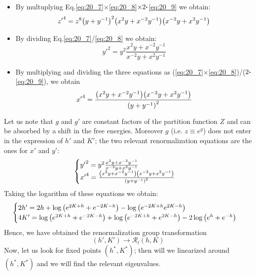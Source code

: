 \documentclass[../main/main.tex]{subfiles}
\begin{document}
\begin{itemize}
\item By multuplying Eq.\eqref{eq:20_7}\( \times \)\eqref{eq:20_8}\( \times 2 \vdot   \)\eqref{eq:20_9} we obtain:
\begin{equation*}
  {z'}^4 = z^8 \qty( y + y^{-1})^2 \qty( x^2y + x^{-2}y^{-1}) \qty( x^{-2}y + x^2 y^{-1})
\end{equation*}
\item By dividing Eq.\eqref{eq:20_7}/\eqref{eq:20_8} we obtain:
\begin{equation*}
  {y'}^2 = y^2 \frac{x^2y + x^{-2}y^{-1}}{x^{-2}y+x^2y^{-1}}
\end{equation*}

\item By multiplying and dividing the three equations as (\eqref{eq:20_7}\( \times \)\eqref{eq:20_8})/(\( 2 \vdot \)\eqref{eq:20_9}), we obtain
\begin{equation*}
  {x'}^4 = \frac{\qty(x^2 y + x^{-2} y^{-1})\qty(x^{-2} y + x^2 y^{-1})  }{ \qty(y + y^{-1})^2 }
\end{equation*}

\end{itemize}

Let us note that \( g \) and \( g' \) are constant factors of the partition function \( Z \) and can be absorbed by a shift in the free energies.
Moreover \( g \) (i.e. \( z \equiv e^g \)) does not enter in the expression of \( h' \) and \( K' \); the two relevant renormalization equations are the ones for \( x' \) and \( y' \):
\begin{equation*}
  \begin{cases}
   {y'}^2 = y^2 \frac{x^2y + x^{-2}y^{-1}}{x^{-2}y+x^2y^{-1}} \\
   {x'}^4 = \frac{\qty(x^2 y + x^{-2} y^{-1})\qty(x^{-2} y + x^2 y^{-1})  }{ \qty(y + y^{-1})^2 }
  \end{cases}
\end{equation*}
Taking the logarithm of these equations we obtain:
\begin{equation}
  \begin{cases}
   2h' = 2h + \log{\qty(e^{2K+h} + e^{-2K-h}) } - \log{ \qty(e^{-2K+h} e^{2K-h}) }  \\
  4K' = \log{ \qty(e^{2K+h}+ e^{-2K-h})} + \log{\qty(e^{-2K+h}+e^{2K-h})} - 2 \log{\qty(e^h + e^{-h})}
  \end{cases}
  \label{eq:20_10}
\end{equation}
Hence, we have obtained the renormalization group transformation
\begin{equation*}
  (h',K') \rightarrow \mathcal{R}_l (h,K)
\end{equation*}
Now, let us look for fixed points \( (h^*,K^*) \); then will we linearized around \( (h^*,K^*) \) and we will find the relevant eigenvalues.
\end{document}
